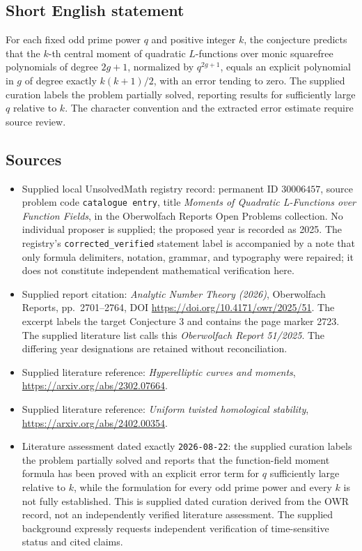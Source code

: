 \documentclass[11pt]{article}
\begin{document}
\subsection{Short English statement}
For each fixed odd prime power \(q\) and positive integer \(k\), the conjecture predicts that the \(k\)-th central moment of quadratic \(L\)-functions over monic squarefree polynomials of degree \(2g+1\), normalized by \(q^{2g+1}\), equals an explicit polynomial in \(g\) of degree exactly \(k(k+1)/2\), with an error tending to zero. The supplied curation labels the problem partially solved, reporting results for sufficiently large \(q\) relative to \(k\). The character convention and the extracted error estimate require source review.
\subsection{Sources}
\begin{itemize}
\item Supplied local UnsolvedMath registry record: permanent ID \(30006457\), source problem code \texttt{catalogue entry}, title \emph{Moments of Quadratic L-Functions over Function Fields}, in the Oberwolfach Reports Open Problems collection. No individual proposer is supplied; the proposed year is recorded as 2025. The registry's \texttt{corrected\_verified} statement label is accompanied by a note that only formula delimiters, notation, grammar, and typography were repaired; it does not constitute independent mathematical verification here.
\item Supplied report citation: \emph{Analytic Number Theory (2026)}, Oberwolfach Reports, pp.\ 2701--2764, DOI \url{https://doi.org/10.4171/owr/2025/51}. The excerpt labels the target Conjecture 3 and contains the page marker 2723. The supplied literature list calls this \emph{Oberwolfach Report 51/2025}. The differing year designations are retained without reconciliation.
\item Supplied literature reference: \emph{Hyperelliptic curves and moments}, \url{https://arxiv.org/abs/2302.07664}.
\item Supplied literature reference: \emph{Uniform twisted homological stability}, \url{https://arxiv.org/abs/2402.00354}.
\item Literature assessment dated exactly \texttt{2026-08-22}: the supplied curation labels the problem partially solved and reports that the function-field moment formula has been proved with an explicit error term for \(q\) sufficiently large relative to \(k\), while the formulation for every odd prime power and every \(k\) is not fully established. This is supplied dated curation derived from the OWR record, not an independently verified literature assessment. The supplied background expressly requests independent verification of time-sensitive status and cited claims.
\end{itemize}
\end{document}
